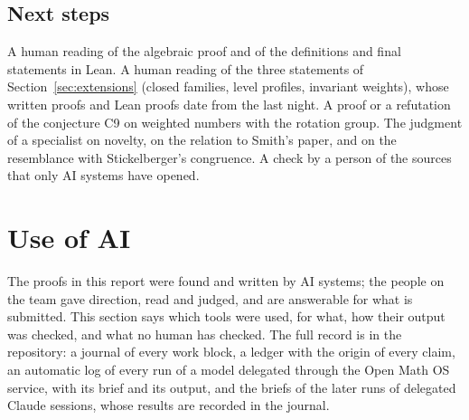 \documentclass[11pt]{article}
\theoremstyle{definition}
\theoremstyle{remark}
\numberwithin{equation}{section}
\numberwithin{figure}{section}
\begin{document}
\subsection{Next steps}
A human reading of the algebraic proof and of the definitions and final statements in Lean. A human reading of
the three statements of Section~\ref{sec:extensions} (closed families, level profiles, invariant weights),
whose written proofs and Lean proofs date from the last night. A proof or a refutation of the conjecture C9
on weighted numbers with the rotation group. The judgment of a specialist on novelty, on the relation to
Smith's paper, and on the resemblance with Stickelberger's congruence. A check by a person of the sources
that only AI systems have opened.

\section{Use of AI}\label{sec:ai}
The proofs in this report were found and written by AI systems; the people on the team gave direction, read
and judged, and are answerable for what is submitted. This section says which tools were used, for what, how
their output was checked, and what no human has checked. The full record is in the repository: a journal of
every work block, a ledger with the origin of every claim, an automatic log of every run of a model
delegated through the Open Math OS service, with its brief and its output, and the briefs of the later runs
of delegated Claude sessions, whose results are recorded in the journal.
\end{document}
